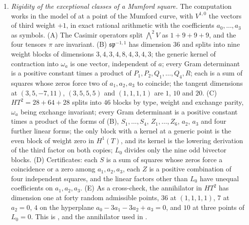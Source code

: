 \begin{enumerate}[label=\textup{(\Roman*)},leftmargin=*]
\item \emph{Rigidity of the exceptional classes of a Mumford square.} The
  computation works in the model of  at a point of the
  Mumford curve, with $V^{1,0}$ the vectors of third weight $+1$, in exact
  rational arithmetic with the coefficients $a_{0},\dots,a_{3}$ as symbols.
  (A) The Casimir operators split ${\textstyle\bigwedge^{2}}V$ as $1+9+9+9$,
  and the four tensors $\pi$ are invariant. (B) $\mathfrak{sp}^{-1,1}$ has dimension $36$ and splits into nine weight
  blocks of dimensions $3,4,3,4,8,4,3,4,3$; the generic kernel of contraction
  into $\omega_{a}$ is one vector, independent of $a$; every Gram determinant
  is a positive constant times a product of $P_{1},P_{2},Q_{1},\dots,Q_{4},R$;
  each is a sum of squares whose zeros force two of $a_{1},a_{2},a_{3}$ to
  coincide; the tangent dimensions at $(3,5,-7,11)$, $(3,5,5,5)$ and
  $(1,1,1,1)$ are $1$, $10$ and $20$. (C) $HT^{2}=28+64+28$ splits into $46$
  blocks by type, weight and exchange parity, $\omega_{a}$ being exchange
  invariant; every Gram determinant is a positive constant times a product of
  the forms of (B), $S_{1},\dots,S_{4}$, $Z_{1},\dots,Z_{6}$, $a_{2}$, $a_{3}$
  and four further linear forms; the only block with a kernel at a generic
  point is the even block of weight zero in $H^{1}(T)$, and its kernel is the
  lowering derivation of the third factor on both copies; $L_{0}$ divides only
  the nine odd bivector blocks. (D) Certificates: each $S$ is a sum of squares
  whose zeros force a coincidence or a zero among $a_{1},a_{2},a_{3}$, each
  $Z$ is a positive combination of four independent squares, and the linear
  factors other than $L_{0}$ have unequal coefficients on $a_{1},a_{2},a_{3}$.
  (E) As a cross-check, the annihilator in $HT^{2}$ has dimension one at forty
  random admissible points, $36$ at $(1,1,1,1)$, $7$ at $a_{2}=0$, $4$ on the
  hyperplane $a_{0}-3a_{1}-3a_{2}+a_{3}=0$, and $10$ at three points of
  $L_{0}=0$. This is ,  and
  the annihilator used in .


\end{enumerate}
